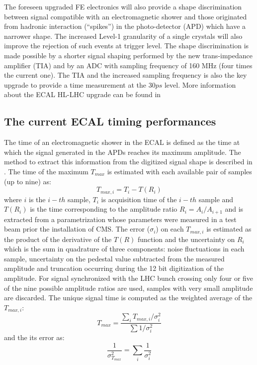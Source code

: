 The foreseen upgraded FE electronics will also provide a shape discrimination between
signal compatible with an electromagnetic shower and those originated from hadronic interaction (``spikes'') in
the photo-detector (APD) which have a narrower shape. The increased Level-1 granularity of a single crystals
will also improve the rejection of such events at trigger level.
The shape discrimination is made possible by a shorter signal shaping performed by the new trans-impedance amplifier
(TIA) and by an ADC with sampling frequency of 160 MHz (four times the current one). The TIA and the increased sampling
frequency is also the key upgrade to provide a time measurement at the $30 ps$ level.
More information about the ECAL HL-LHC upgrade can be found in~\cite{calo_phase2_tdr}


\subsection{The current ECAL timing performances}
\label{sec:ecal_time_run1}
The time of an electromagnetic shower in the ECAL is defined as the time at which the signal generated
in the APDs reaches its maximum amplitude. The method to extract this information from the digitized signal
shape is described in \cite{ecal_time_reco}. The time of the maximum $T_{max}$ is estimated with each
available pair of samples (up to nine) as:
\[
T_{max, i} = T_i - T(R_i)
\]
where $i$ is the $i-th$ sample, $T_i$ is acquisition time of the $i-th$ sample and $T(R_i)$ is the time
corresponding to the amplitude ratio $R_i = A_i/A_{i+1}$ and is extracted from a parametrization whose parameters
were measured in a test beam prior the installation of CMS. The error ($\sigma_i$) on each $T_{max, i}$ is estimated as
the product of the derivative of the $T(R)$ function and the uncertainty on $R_i$ which is the sum in quadrature
of three components: noise fluctuations in each sample, uncertainty on the pedestal value subtracted from the measured amplitude
and truncation occurring during the 12 bit digitization of the amplitude.
For signal synchronized with the LHC bunch crossing only four or five of the nine possible amplitude
ratios are used, samples with very small amplitude are discarded. The unique signal time is computed
as the weighted average of the  $T_{max, i}$:
\[
  T_{max} = \frac{\sum_i T_{max, i}/\sigma_i^2}{\sum 1/\sigma_i^2}
\]
and the its error as:
\[
  \frac{1}{\sigma_{T_{max}}^2} = \sum_i\frac{1}{\sigma_i^2}
\]

